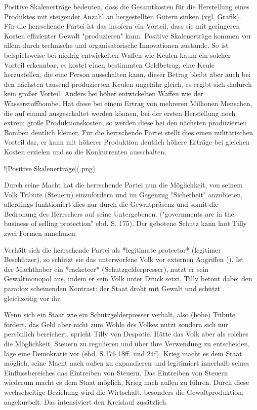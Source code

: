 Positive Skalenerträge bedeuten, dass die Gesamtkosten für die Herstellung eines Produktes mit steigender  Anzahl an hergestellten Gütern sinken (vgl. Grafik).
Für die herrschende Partei ist das insofern ein Vorteil, dass sie mit geringeren Kosten effizienter Gewalt "produzieren" kann. Positive Skalenerträge kommen vor allem durch technische und organisatorische Innovationen zustande.
So ist beispielsweise bei niedrig entwickelten Waffen wie Keulen kaum ein solcher Vorteil erkennbar, es kostet einen bestimmten Geldbetrag, eine Keule herzustellen, die  eine Person ausschalten kann, dieser Betrag bleibt aber auch bei den nächsten tausend produzierten Keulen ungefähr gleich, es ergibt sich dadurch kein großer Vorteil.
Anders bei höher entwickelten Waffen wie der Wasserstoffbombe.
Hat diese bei einem Ertrag von mehreren Millionen Menschen, die auf einmal ausgeschaltet werden können, bei der ersten Herstellung noch extrem große Produktionskosten, so werden diese bei den nächsten produzierten Bomben deutlich kleiner.
Für die herrschende Partei stellt dies einen militärischen Vorteil dar, er kann mit höherer Produktion deutlich höhere Erträge bei gleichen Kosten erzielen und so die Konkurrenten ausschalten.

![Positive Skalenerträge](\img{}.png)


Durch seine Macht hat die herrschende Partei nun die Möglichkeit, von seinem Volk  Tribute (Steuern) einzufordern und im Gegenzug "Sicherheit" anzubieten, allerdings funktioniert dies nur durch die Gewaltpräsenz und somit die Bedrohung des Herrschers auf seine Untergebenen. ("governments are in the business of selling protection" ebd. S. 175).
Der gebotene Schutz kann laut Tilly zwei Formen annehmen:

Verhält sich die herrschende Partei als *legitimate protector* (legitimer Beschützer), so schützt sie das unterworfene Volk vor externen Angriffen ().
Ist der Machthaber ein *racketeer* (Schutzgelderpresser), nutzt er sein Gewaltmonopol aus, indem er sein Volk unter Druck setzt.
Tilly betont dabei den paradox scheinenden Kontrast: der Staat droht mit Gewalt und schützt gleichzeitig vor ihr.

Wenn sich ein Staat wie ein Schutzgelderpresser verhält, also (hohe) Tribute fordert, das Geld aber nicht zum Wohle des Volkes nutzt sondern sich nur persönlich bereichert, spricht Tilly von Despotie.
Hätte das Volk aber als solches die Möglichkeit, Steuern zu regulieren und über ihre Verwendung zu entscheiden, läge eine Demokratie vor (ebd. S.176 18ff. und 24f).
Krieg macht es dem Staat möglich, seine Macht nach außen zu expandieren und legitimiert innerhalb seines Einflussbereiches das Eintreiben von Steuern. Das Eintreiben von Steuern  wiederum macht es dem Staat möglich, Krieg nach außen zu führen. Durch diese wechselseitige Beziehung wird die Wirtschaft, besonders die Gewaltproduktion, angekurbelt.
Das intensiviert den Kreislauf zusätzlich.

